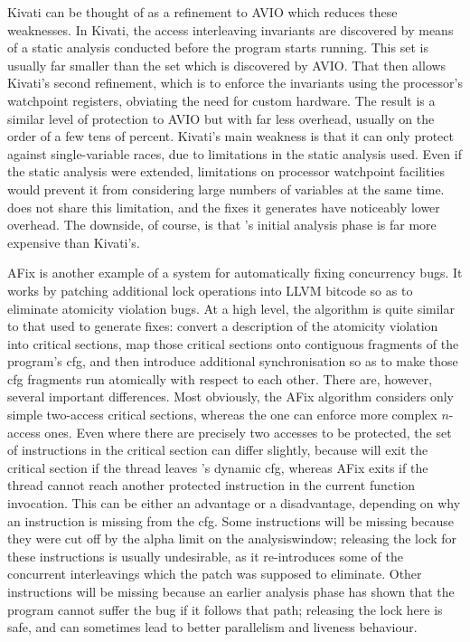 Kivati\cite{Chew2010} can be thought of as a refinement to AVIO which
reduces these weaknesses.  In Kivati, the access interleaving
invariants are discovered by means of a static analysis conducted
before the program starts running.  This set is usually far smaller
than the set which is discovered by AVIO.  That then allows Kivati's
second refinement, which is to enforce the invariants using the
processor's watchpoint registers\cite[Chapter 16.2: Debug
  Registers]{Intel2009}, obviating the need for custom hardware.  The
result is a similar level of protection to AVIO but with far less
overhead, usually on the order of a few tens of percent.  Kivati's
main weakness is that it can only protect against single-variable
races, due to limitations in the static analysis used.  Even if the
static analysis were extended, limitations on processor watchpoint
facilities would prevent it from considering large numbers of
variables at the same time.  {\Technique} does not share this
limitation, and the fixes it generates have noticeably lower overhead.
The downside, of course, is that {\technique}'s initial analysis phase
is far more expensive than Kivati's.

AFix\cite{Jin2011} is another example of a system for automatically
fixing concurrency bugs.  It works by patching additional lock
operations into LLVM bitcode so as to eliminate atomicity violation
bugs.  At a high level, the algorithm is quite similar to that used to
generate {\technique} fixes: convert a description of the atomicity
violation into critical sections, map those critical sections onto
contiguous fragments of the program's \gls{cfg}, and then introduce
additional synchronisation so as to make those \gls{cfg} fragments run
atomically with respect to each other.  There are, however, several
important differences.  Most obviously, the AFix algorithm considers
only simple two-access critical sections, whereas the {\technique} one
can enforce more complex $n$-access ones.  Even where there are
precisely two accesses to be protected, the set of instructions in the
critical section can differ slightly, because {\technique} will exit
the critical section if the thread leaves {\StateMachine}'s dynamic
\gls{cfg}, whereas AFix exits if the thread cannot reach another
protected instruction in the current function invocation.  This can be
either an advantage or a disadvantage, depending on why an instruction
is missing from the {\StateMachine} \gls{cfg}.  Some instructions will
be missing because they were cut off by the \gls{alpha} limit on the
\gls{analysiswindow}; releasing the lock for these instructions is
usually undesirable, as it re-introduces some of the concurrent
interleavings which the patch was supposed to eliminate.  Other
instructions will be missing because an earlier analysis phase has
shown that the program cannot suffer the bug if it follows that path;
releasing the lock here is safe, and can sometimes lead to better
parallelism and liveness behaviour.

